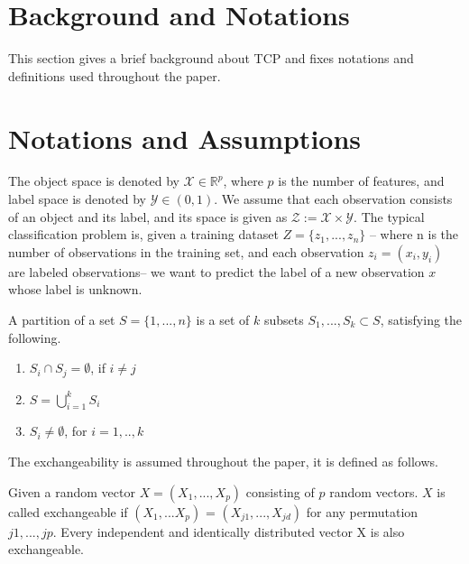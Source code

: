 \documentclass[main]{subfiles}
\begin{document}
\section{Background and Notations}
This section gives a brief background about TCP and fixes notations and definitions used throughout the paper.

\section*{Notations and Assumptions}
The object space is denoted by $\mathcal{X} \in \mathbb{R}^p$, where $p$ is the number of features, and  label space is denoted by $\mathcal{Y} \in (0,1)$. We assume that each observation consists of an object and its label, and its space is given as $\mathcal{Z} := \mathcal{X} \times \mathcal{Y}$. %
The typical classification problem is, given a training dataset $Z = \{ z_1 , ..., z_n \} $ -- where n is the number of observations in the training set, and each observation $z_i = (x_i, y_i)$ are labeled observations-- we want to predict the label of a new observation $x$ whose label is unknown. 


\begin{definition} 
A partition of a set $S = \{ 1,...,n\}$ is a set of $k$ subsets $S_1, ..., S_k \subset S$, satisfying the following.
\begin{enumerate}
\item $S_i \cap S_j = \emptyset$, if $i \neq j$
\item $S = \bigcup_{i=1}^k S_i$
\item $ S_i \neq \emptyset$, for $i={1,..,k}$
\end{enumerate}
\end{definition}

The exchangeability is assumed throughout the paper, it is defined as follows.
\begin{definition} [Exchangeability]
Given a random vector $X= (X_1, ..., X_p)$ consisting of $p$ random vectors. $X$ is called exchangeable if $(X_1,...X_p)$ = $(X_{j1},...,X_{jd})$ for any permutation $j1,...,jp$. Every independent and identically distributed vector X is  also exchangeable. 
\end{definition}
\end{document}
